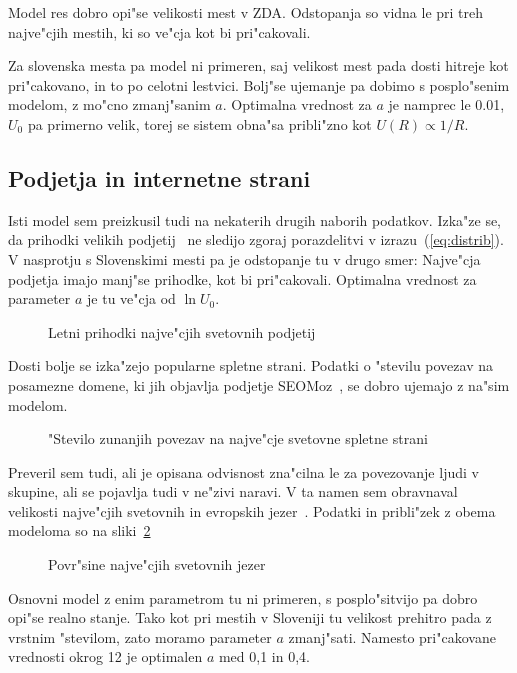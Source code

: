 \documentclass[a4paper,10pt]{article}
\begin{document}
Model res dobro opi"se velikosti mest v ZDA. Odstopanja so vidna le pri treh najve"cjih mestih, ki so ve"cja kot bi pri"cakovali. 

Za slovenska mesta pa model ni primeren, saj velikost mest pada dosti hitreje kot pri"cakovano, in to po celotni lestvici. Bolj"se ujemanje pa dobimo s posplo"senim modelom, z mo"cno zmanj"sanim $a$. Optimalna vrednost za $a$ je namprec le 0.01, $U_0$ pa primerno velik, torej se sistem obna"sa pribli"zno kot $U(R) \propto 1/R$. 


\subsection{Podjetja in internetne strani}

Isti model sem preizkusil tudi na nekaterih drugih naborih podatkov. Izka"ze se, da prihodki velikih podjetij~\cite{fortune} ne sledijo zgoraj porazdelitvi v izrazu~(\ref{eq:distrib}). V nasprotju s Slovenskimi mesti pa je odstopanje tu v drugo smer: Najve"cja podjetja imajo manj"se prihodke, kot bi pri"cakovali. Optimalna vrednost za parameter $a$ je tu ve"cja od $\ln U_0$. 

\begin{figure}[!h]

\caption{Letni prihodki najve"cjih svetovnih podjetij}
\label{fig:fortune}
\end{figure}

Dosti bolje se izka"zejo popularne spletne strani. Podatki o "stevilu povezav na posamezne domene, ki jih objavlja podjetje SEOMoz~\cite{seomoz}, se dobro ujemajo z na"sim modelom. 

\begin{figure}[!h]

\caption{"Stevilo zunanjih povezav na najve"cje svetovne spletne strani} 
\end{figure}

Preveril sem tudi, ali je opisana odvisnost zna"cilna le za povezovanje ljudi v skupine, ali se pojavlja tudi v ne"zivi naravi. V ta namen sem obravnaval velikosti najve"cjih svetovnih in evropskih jezer~\cite{jezera-svet,jezera-eu}. Podatki in pribli"zek z obema modeloma so na sliki~\ref{fig:jezera}

\begin{figure}[!h]

\caption{Povr"sine najve"cjih svetovnih jezer} 
\label{fig:jezera}
\end{figure}

Osnovni model z enim parametrom tu ni primeren, s posplo"sitvijo pa dobro opi"se realno stanje. Tako kot pri mestih v Sloveniji tu velikost prehitro pada z vrstnim "stevilom, zato moramo parameter $a$ zmanj"sati. Namesto pri"cakovane vrednosti okrog 12 je optimalen $a$ med 0,1 in 0,4. 
\end{document}
